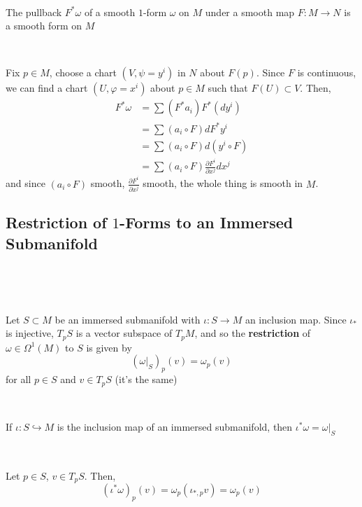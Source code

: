 \documentclass{article}
\begin{document}
\begin{proposition}
  \

  The pullback $F^*\omega$ of a smooth $1$-form $\omega$ on $M$ under a smooth map $F: M \to N$ is a smooth form on $M$
\end{proposition}

\begin{customproof}
  \

  Fix $p \in M$, choose a chart $(V,\psi = y^i)$ in $N$ about $F(p)$. Since $F$ is continuous, we can find a chart $(U, \varphi = x^i)$ about $p \in M$ such that $F(U) \subset V$. Then,
  \begin{align*}
    F^* \omega &= \sum (F^*a_i)F^*(dy^i)\\
    &= \sum (a_i \circ F)dF^*y^i\\
    &= \sum (a_i \circ F)d(y^i \circ F)\\
    &= \sum (a_i \circ F) \frac{\partial F^i}{\partial x^j} dx^j
  \end{align*}and since $(a_i \circ F)$ smooth, $\frac{\partial F^i}{\partial x^j}$ smooth, the whole thing is smooth in $M$.
\end{customproof}

\subsection{Restriction of $1$-Forms to an Immersed Submanifold}
\

\begin{definition}
  \

  Let $S\subset M$ be an immersed submanifold with $\iota: S \to M$ an inclusion map. Since $\iota_*$ is injective, $T_pS$ is a vector subspace of $T_pM$, and so the \textbf{restriction} of $\omega \in \Omega^1(M)$ to $S$ is given by $$(\omega \vert_S)_p(v) = \omega_p(v)$$for all $p \in S$ and $v \in T_pS$ (it's the same)
\end{definition}

\begin{proposition}
  \

  If $\iota: S \hookrightarrow M$ is the inclusion map of an immersed submanifold, then $\iota^* \omega = \omega \vert_S$
\end{proposition}

\begin{customproof}
  \

  Let $p \in S$, $v \in T_pS$. Then, $$(\iota^* \omega)_p(v) = \omega_{p}(\iota_{*,p}v) = \omega_p(v)$$
\end{customproof}
\end{document}
